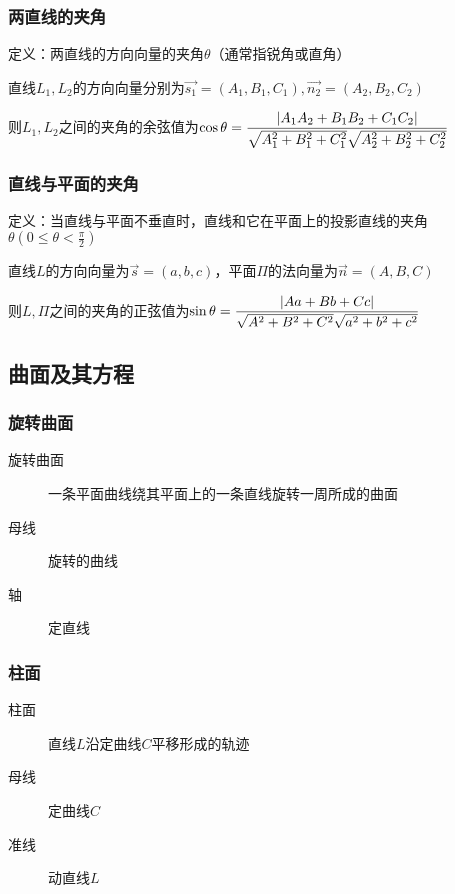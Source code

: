 \documentclass{article} %
\begin{document}
\subsubsection{两直线的夹角}
定义：两直线的方向向量的夹角$\theta$（通常指锐角或直角）\par
直线$L_1,L_2$的方向向量分别为$\overrightarrow{s_1}=(A_1,B_1,C_1),\overrightarrow{n_2}=(A_2,B_2,C_2)$\par
则$L_1,L_2$之间的夹角的余弦值为\textcolor{red}{$\displaystyle\cos\theta={|A_1A_2+B_1B_2+C_1C_2|\over\sqrt{A_1^2+B_1^2+C_1^2}\sqrt{A_2^2+B_2^2+C_2^2}}$}\par

\subsubsection{直线与平面的夹角}
定义：当直线与平面不垂直时，直线和它在平面上的投影直线的夹角$\theta(0\leq \theta<\frac{\pi}{2})$\par
直线$L$的方向向量为$\overrightarrow{s}=(a,b,c)$，平面$\Pi$的法向量为$\overrightarrow{n}=(A,B,C)$\par
则$L,\Pi$之间的夹角的正弦值为\textcolor{red}{$\displaystyle\sin\theta={|Aa+Bb+Cc|\over\sqrt{A^2+B^2+C^2}\sqrt{a^2+b^2+c^2}}$}\par

\subsection{曲面及其方程}
\subsubsection{旋转曲面}
\begin{description}
    \item[旋转曲面] {一条平面曲线绕其平面上的一条直线旋转一周所成的曲面}
    \item[母线] {旋转的曲线}
    \item[轴] {定直线}
\end{description}

\subsubsection{柱面}
\begin{description}
    \item[柱面] {直线$L$沿定曲线$C$平移形成的轨迹}
    \item[母线] {定曲线$C$}
    \item[准线] {动直线$L$}
\end{description}
\end{document}
